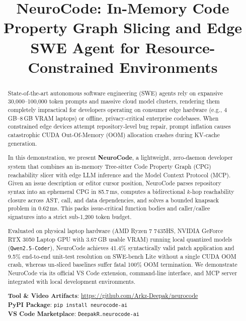 \documentclass[10pt, conference]{IEEEtran}
\begin{document}
\title{NeuroCode: In-Memory Code Property Graph Slicing and Edge SWE Agent for Resource-Constrained Environments}

\author{
}

\maketitle

\begin{abstract}
State-of-the-art autonomous software engineering (SWE) agents rely on expansive 30,000--100,000 token prompts and massive cloud model clusters, rendering them completely impractical for developers operating on consumer edge hardware (e.g., 4\,GB--8\,GB VRAM laptops) or offline, privacy-critical enterprise codebases. When constrained edge devices attempt repository-level bug repair, prompt inflation causes catastrophic CUDA Out-Of-Memory (OOM) allocation crashes during KV-cache generation. 

In this demonstration, we present \textbf{NeuroCode}, a lightweight, zero-daemon developer system that combines an in-memory Tree-sitter Code Property Graph (CPG) reachability slicer with edge LLM inference and the Model Context Protocol (MCP). Given an issue description or editor cursor position, NeuroCode parses repository syntax into an ephemeral CPG in 85.7\,ms, computes a bidirectional $k$-hop reachability closure across AST, call, and data dependencies, and solves a bounded knapsack problem in 0.62\,ms. This packs issue-critical function bodies and caller/callee signatures into a strict sub-1,200 token budget. 

Evaluated on physical laptop hardware (AMD Ryzen 7 7435HS, NVIDIA GeForce RTX 3050 Laptop GPU with 3.67\,GB usable VRAM) running local quantized models (\texttt{Qwen2.5-Coder}), NeuroCode achieves 41.4\% syntactically valid patch application and 9.5\% end-to-end unit-test resolution on SWE-bench Lite without a single CUDA OOM crash, whereas un-sliced baselines suffer fatal 100\% OOM termination. We demonstrate NeuroCode via its official VS Code extension, command-line interface, and MCP server integrated with local development environments.

\textbf{Tool \& Video Artifacts}: \url{https://github.com/Arkz-Deepak/neurocode} \\
\textbf{PyPI Package}: \texttt{pip install neurocode-ai} \\
\textbf{VS Code Marketplace}: \texttt{DeepakR.neurocode-ai}
\end{abstract}
\end{document}

